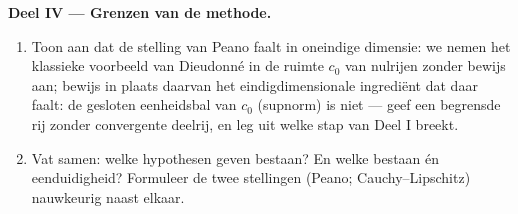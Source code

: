 \begin{problem}[{Weekendopgave --- bestaan van oplossingen van $x'
= f(t, x)$ zonder Lipschitz}]
\medskip
\noindent\textbf{Deel IV --- Grenzen van de methode.}
\begin{enumerate}[resume]
  \item Toon aan dat de stelling van Peano faalt in oneindige
        dimensie: we nemen het klassieke voorbeeld van Dieudonné
        in de ruimte $c_0$ van nulrijen zonder bewijs aan; bewijs
        in plaats daarvan het eindigdimensionale ingrediënt dat
        daar faalt: de gesloten eenheidsbal van $c_0$ (supnorm) is
        niet  --- geef een begrensde rij zonder convergente
        deelrij, en leg uit welke stap van Deel I breekt.
  \item Vat samen: welke hypothesen geven bestaan? En welke
        bestaan én eenduidigheid? Formuleer de twee stellingen
        (Peano; Cauchy--Lipschitz) nauwkeurig naast elkaar.
\end{enumerate}


\end{problem}
